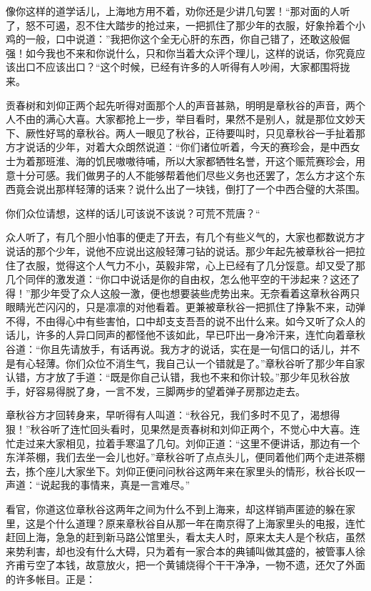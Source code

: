 \documentclass[12pt,UTF8]{ctexbook}
\begin{document}
{{{像你这样的道学话儿，上海地方用不着，劝你还是少讲几句罢！“那对面的人听了，怒不可遏，忍不住大踏步的抢过来，一把抓住了那少年的衣服，好象拎着个小鸡的一般，口中说道：”我把你这个全无心肝的东西，你自己错了，还敢这般倔强！如今我也不来和你说什么，只和你当着大众评个理儿，这样的说话，你究竟应该出口不应该出口？“这个时候，已经有许多的人听得有人吵闹，大家都围将拢来。

贡春树和刘仰正两个起先听得对面那个人的声音甚熟，明明是章秋谷的声音，两个人不由的满心大喜。大家都抢上一步，举目看时，果然不是别人，就是那位文妙天下、厥性好骂的章秋谷。两人一眼见了秋谷，正待要叫时，只见章秋谷一手扯着那方才说话的少年，对着大众朗然说道：“你们诸位听着，今天的赛珍会，是中西女士为着那班淮、海的饥民嗷嗷待哺，所以大家都牺牲名誉，开这个赈荒赛珍会，用意十分可感。我们做男子的人不能够帮着他们尽些义务也还罢了，怎么方才这个东西竟会说出那样轻薄的话来？说什么出了一块钱，倒打了一个中西合璧的大茶围。

你们众位请想，这样的话儿可该说不该说？可荒不荒唐？“

众人听了，有几个胆小怕事的便走了开去，有几个有些义气的，大家也都数说方才说话的那个少年，说他不应说出这般轻薄刁钻的说话。那少年起先被章秋谷一把拉住了衣服，觉得这个人气力不小，英毅非常，心上已经有了几分馁意。却又受了那几个同伴的激发道：“你口中说话是你的自由权，怎么他平空的干涉起来？这还了得！”那少年受了众人这般一激，便也想要装些虎势出来。无奈看着这章秋谷两只眼睛光芒闪闪的，只是凛凛的对他看着。更兼被章秋谷一把抓住了挣紥不来，动弹不得，不由得心中有些害怕，口中却支支吾吾的说不出什么来。如今又听了众人的话儿，许多的人异口同声的都怪他不该如此，早已吓出一身冷汗来，连忙向着章秋谷道：“你且先请放手，有话再说。我方才的说话，实在是一句信口的话儿，并不是有心轻薄。你们众位不消生气，我自己认一个错就是了。”章秋谷听了那少年自家认错，方才放了手道：“既是你自己认错，我也不来和你计较。”那少年见秋谷放手，好容易得脱了身，一言不发，三脚两步的望着弹子房那边走去。

章秋谷方才回转身来，早听得有人叫道：“秋谷兄，我们多时不见了，渴想得狠！”秋谷听了连忙回头看时，见果然是贡春树和刘仰正两个，不觉心中大喜。连忙走过来大家相见，拉着手寒温了几句。刘仰正道：“这里不便讲话，那边有一个东洋茶棚，我们去坐一会儿也好。”章秋谷听了点点头儿，便同着他们两个走进茶棚去，拣个座儿大家坐下。刘仰正便问问秋谷这两年来在家里头的情形，秋谷长叹一声道：“说起我的事情来，真是一言难尽。”

看官，你道这位章秋谷这两年之间为什么不到上海来，却这样销声匿迹的躲在家里，这是个什么道理？原来章秋谷自从那一年在南京得了上海家里头的电报，连忙赶回上海，急急的赶到新马路公馆里头，看太夫人时，原来太夫人是个秋痁，虽然来势利害，却也没有什么大碍，只为着有一家合本的典铺叫做其盛的，被管事人徐齐甫亏空了本钱，故意放火，把一个黄铺烧得个干干净净，一物不遗，还欠了外面的许多帐目。正是：

}}}
\end{document}
